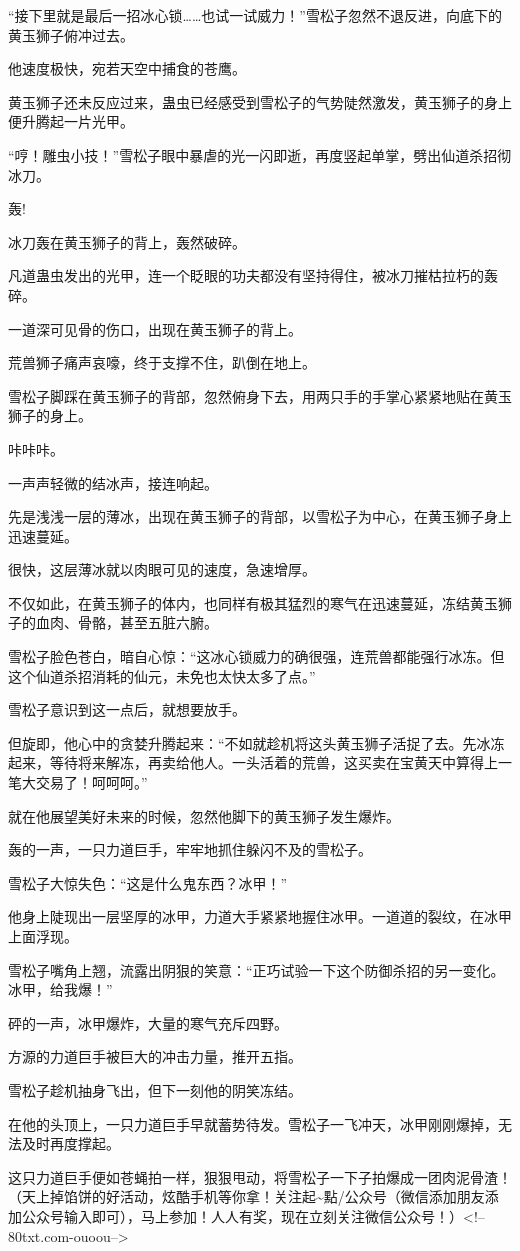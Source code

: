 \begin{this_body}
“接下里就是最后一招冰心锁……也试一试威力！”雪松子忽然不退反进，向底下的黄玉狮子俯冲过去。

他速度极快，宛若天空中捕食的苍鹰。

黄玉狮子还未反应过来，蛊虫已经感受到雪松子的气势陡然激发，黄玉狮子的身上便升腾起一片光甲。

“哼！雕虫小技！”雪松子眼中暴虐的光一闪即逝，再度竖起单掌，劈出仙道杀招彻冰刀。

轰!

冰刀轰在黄玉狮子的背上，轰然破碎。

凡道蛊虫发出的光甲，连一个眨眼的功夫都没有坚持得住，被冰刀摧枯拉朽的轰碎。

一道深可见骨的伤口，出现在黄玉狮子的背上。

荒兽狮子痛声哀嚎，终于支撑不住，趴倒在地上。

雪松子脚踩在黄玉狮子的背部，忽然俯身下去，用两只手的手掌心紧紧地贴在黄玉狮子的身上。

咔咔咔。

一声声轻微的结冰声，接连响起。

先是浅浅一层的薄冰，出现在黄玉狮子的背部，以雪松子为中心，在黄玉狮子身上迅速蔓延。

很快，这层薄冰就以肉眼可见的速度，急速增厚。

不仅如此，在黄玉狮子的体内，也同样有极其猛烈的寒气在迅速蔓延，冻结黄玉狮子的血肉、骨骼，甚至五脏六腑。

雪松子脸色苍白，暗自心惊：“这冰心锁威力的确很强，连荒兽都能强行冰冻。但这个仙道杀招消耗的仙元，未免也太快太多了点。”

雪松子意识到这一点后，就想要放手。

但旋即，他心中的贪婪升腾起来：“不如就趁机将这头黄玉狮子活捉了去。先冰冻起来，等待将来解冻，再卖给他人。一头活着的荒兽，这买卖在宝黄天中算得上一笔大交易了！呵呵呵。”

就在他展望美好未来的时候，忽然他脚下的黄玉狮子发生爆炸。

轰的一声，一只力道巨手，牢牢地抓住躲闪不及的雪松子。

雪松子大惊失色：“这是什么鬼东西？冰甲！”

他身上陡现出一层坚厚的冰甲，力道大手紧紧地握住冰甲。一道道的裂纹，在冰甲上面浮现。

雪松子嘴角上翘，流露出阴狠的笑意：“正巧试验一下这个防御杀招的另一变化。冰甲，给我爆！”

砰的一声，冰甲爆炸，大量的寒气充斥四野。

方源的力道巨手被巨大的冲击力量，推开五指。

雪松子趁机抽身飞出，但下一刻他的阴笑冻结。

在他的头顶上，一只力道巨手早就蓄势待发。雪松子一飞冲天，冰甲刚刚爆掉，无法及时再度撑起。

这只力道巨手便如苍蝇拍一样，狠狠甩动，将雪松子一下子拍爆成一团肉泥骨渣！（天上掉馅饼的好活动，炫酷手机等你拿！关注起\~{}點/公众号（微信添加朋友添加公众号输入即可），马上参加！人人有奖，现在立刻关注微信公众号！）<!--80txt.com-ouoou-->

\end{this_body}

